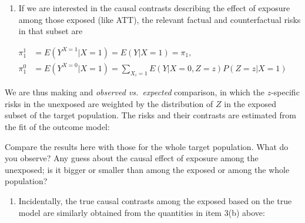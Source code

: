 \documentclass[
]{book}
\newenvironment{Shaded}{\begin{snugshade}}{\end{snugshade}}
\newcommand{\DecValTok}[1]{\textcolor[rgb]{0.00,0.00,0.81}{#1}}
\newcommand{\FunctionTok}[1]{\textcolor[rgb]{0.13,0.29,0.53}{\textbf{#1}}}
\newcommand{\NormalTok}[1]{#1}
\newcommand{\OtherTok}[1]{\textcolor[rgb]{0.56,0.35,0.01}{#1}}
\newcommand{\SpecialCharTok}[1]{\textcolor[rgb]{0.81,0.36,0.00}{\textbf{#1}}}
\providecommand{\tightlist}{%
  \setlength{\itemsep}{0pt}\setlength{\parskip}{0pt}}
\begin{document}
\begin{enumerate}
\def\labelenumi{\arabic{enumi}.}
\setcounter{enumi}{4}
\tightlist
\item
  If we are interested in the causal contrasts describing the
  effect of exposure among those exposed
  (like ATT), the relevant factual and counterfactual risks
  in that subset are
\end{enumerate}

\[
\begin{aligned}
 \pi^1_1 & = E(Y^{X=1}|X=1) = E(Y|X=1) = \pi_1, \\
 \pi^0_1 & = E(Y^{X=0}|X=1) = \sum_{X_i=1} E(Y|X=0, Z=z)P(Z=z|X=1)
\end{aligned}
\]

We are thus making and \emph{observed vs.~expected} comparison, in which
the \(z\)-specific risks in the unexposed are weighted by
the distribution of \(Z\) in the exposed subset of the target population.
The risks and their contrasts are estimated from the fit
of the outcome model:

\begin{Shaded}
\end{Shaded}

Compare the results here with those for the whole
target population. What do you observe?
Any guess about the causal effect of exposure
among the unexposed; is it bigger or smaller than
among the exposed or among the whole population?

\begin{enumerate}
\def\labelenumi{\arabic{enumi}.}
\tightlist
\item
  Incidentally, the true causal contrasts among the exposed
  based on the true model are similarly obtained from the quantities
  in item 3(b) above:
\end{enumerate}

\begin{Shaded}
\end{Shaded}
\end{document}
